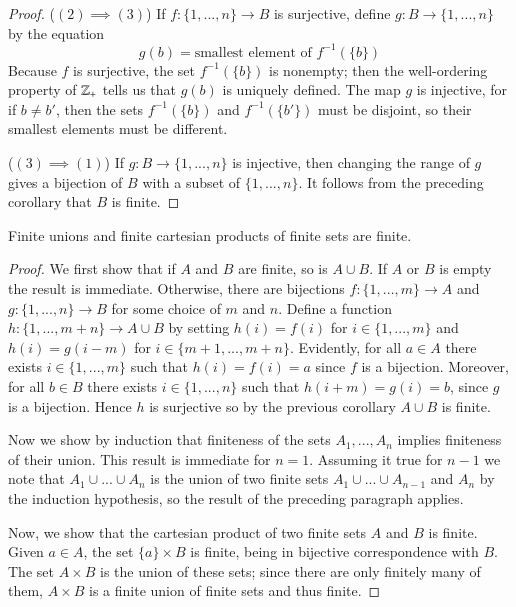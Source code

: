 \documentclass[12pt, a4paper, oneside, openright, titlepage]{book}
\begin{document}
\begin{appendices}
\begin{proof}
        ($(2)\implies (3)$) If $f:\{1,...,n\}\rightarrow B$ is surjective, define $g:B\rightarrow \{1,...,n\}$ by the equation \begin{equation*}
            g(b) = \text{smallest element of } f^{-1}(\{b\})
        \end{equation*}
        Because $f$ is surjective, the set $f^{-1}(\{b\})$ is nonempty; then the well-ordering property of $\mathbb Z_+$ tells us that $g(b)$ is uniquely defined. The map $g$ is injective, for if $b \neq b'$, then the sets $f^{-1}(\{b\})$ and $f^{-1}(\{b'\})$ must be disjoint, so their smallest elements must be different.


        ($(3)\implies (1)$) If $g:B\rightarrow \{1,...,n\}$ is injective, then changing the range of $g$ gives a bijection of $B$ with a subset of $\{1,...,n\}$. It follows from the preceding corollary that $B$ is finite.
    \end{proof}


    \begin{cor}
        Finite unions and finite cartesian products of finite sets are finite.
    \end{cor}
    \begin{proof}
        We first show that if $A$ and $B$ are finite, so is $A\cup B$. If $A$ or $B$ is empty the result is immediate. Otherwise, there are bijections $f:\{1,...,m\}\rightarrow A$ and $g:\{1,...,n\}\rightarrow B$ for some choice of $m$ and $n$. Define a function $h:\{1,...,m+n\}\rightarrow A\cup B$ by setting $h(i) = f(i)$ for $i \in \{1,...,m\}$ and $h(i) = g(i-m)$ for $i \in \{m+1,...,m+n\}$. Evidently, for all $a \in A$ there exists $i \in \{1,...,m\}$ such that $h(i) = f(i) = a$ since $f$ is a bijection. Moreover, for all $b \in B$ there exists $i \in \{1,...,n\}$ such that $h(i+m) = g(i) = b$, since $g$ is a bijection. Hence $h$ is surjective so by the previous corollary $A\cup B$ is finite.

        Now we show by induction that finiteness of the sets $A_1,...,A_n$ implies finiteness of their union. This result is immediate for $n=1$. Assuming it true for $n-1$ we note that $A_1\cup...\cup A_n$ is the union of two finite sets $A_1\cup ... \cup A_{n-1}$ and $A_n$ by the induction hypothesis, so the result of the preceding paragraph applies.

        Now, we show that the cartesian product of two finite sets $A$ and $B$ is finite. Given $a \in A$, the set $\{a\}\times B$ is finite, being in bijective correspondence with $B$. The set $A \times B$ is the union of these sets; since there are only finitely many of them, $A\times B$ is a finite union of finite sets and thus finite.


\end{proof}
\end{appendices}
\end{document}
